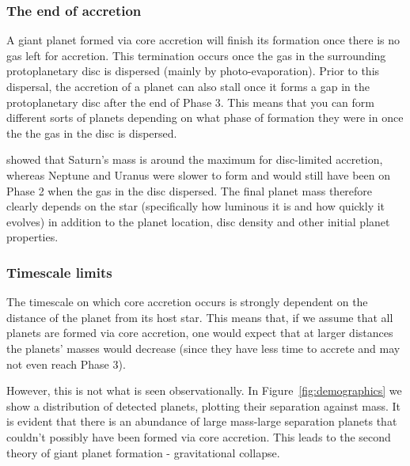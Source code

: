 \documentclass[twocolumn]{aastex631}
\begin{document}
\subsubsection{The end of accretion}

A giant planet formed via core accretion will finish its formation once there is no gas left for accretion. This termination occurs once the gas in the surrounding protoplanetary disc is dispersed (mainly by photo-evaporation). Prior to this dispersal, the accretion of a planet can also stall once it forms a gap in the protoplanetary disc after the end of Phase 3. This means that you can form different sorts of planets depending on what phase of formation they were in once the the gas in the disc is dispersed.

\citet{Lissauer+2009} showed that Saturn's mass is around the maximum for disc-limited accretion, whereas Neptune and Uranus were slower to form and would still have been on Phase 2 when the gas in the disc dispersed. The final planet mass therefore clearly depends on the star (specifically how luminous it is and how quickly it evolves) in addition to the planet location, disc density and other initial planet properties.

\subsubsection{Timescale limits}

The timescale on which core accretion occurs is strongly dependent on the distance of the planet from its host star. This means that, if we assume that all planets are formed via core accretion, one would expect that at larger distances the planets' masses would decrease (since they have less time to accrete and may not even reach Phase 3).

However, this is not what is seen observationally. In Figure~\ref{fig:demographics} we show a distribution of detected planets, plotting their separation against mass. It is evident that there is an abundance of large mass-large separation planets that couldn't possibly have been formed via core accretion. This leads to the second theory of giant planet formation - gravitational collapse.
\end{document}

